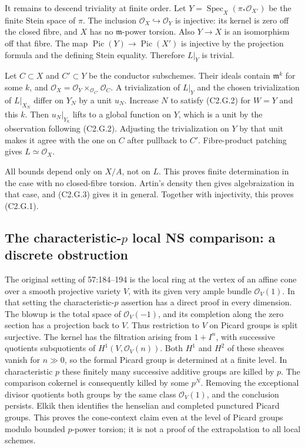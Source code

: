 It remains to descend triviality at finite order. Let
$Y=\operatorname{Spec}_X(\pi_*\mathcal O_{X'})$ be the finite Stein space
of $\pi$. The inclusion $\mathcal O_X\hookrightarrow\mathcal O_Y$ is
injective: its kernel is zero off the closed fibre, and $X$ has no
$\mathfrak m$-power torsion. Also $Y\to X$ is an isomorphism off that
fibre. The map $\operatorname{Pic}(Y)\to\operatorname{Pic}(X')$ is
injective by the projection formula and the defining Stein equality.
Therefore $L|_Y$ is trivial.

Let $C\subset X$ and $C'\subset Y$ be the conductor subschemes. Their
ideals contain $\mathfrak m^k$ for some $k$, and
$\mathcal O_X=\mathcal O_Y\times_{\mathcal O_{C'}}\mathcal O_C$.
A trivialization of $L|_Y$ and the chosen trivialization of $L|_{X_N}$
differ on $Y_N$ by a unit $u_N$. Increase $N$ to satisfy (C2.G.2) for
$W=Y$ and this $k$. Then $u_N|_{Y_k}$ lifts to a global function on $Y$,
which is a unit by the observation following (C2.G.2). Adjusting the
trivialization on $Y$ by that unit makes it agree with the one on $C$
after pullback to $C'$. Fibre-product patching gives $L\simeq\mathcal O_X$.

All bounds depend only on $X/A$, not on $L$. This proves finite
determination in the case with no closed-fibre torsion. Artin's density
then gives algebraization in that case, and (C2.G.3) gives it in general.
Together with injectivity, this proves (C2.G.1).

\subsection{The characteristic-$p$ local NS comparison: a discrete obstruction}

The original setting of 57:184--194 is the local ring at the vertex of an
affine cone over a smooth projective variety $V$, with its given very ample
bundle $\mathcal O_V(1)$. In that setting the characteristic-$p$ assertion
has a direct proof in every dimension. The blowup is the total space of
$\mathcal O_V(-1)$, and its completion along the zero section has a projection
back to $V$. Thus restriction to $V$ on Picard groups is split surjective.
The kernel has the filtration arising from $1+I^n$, with successive quotients
subquotients of $H^1(V,\mathcal O_V(n))$. Both $H^1$ and $H^2$ of these sheaves
vanish for $n\gg0$, so the formal Picard group is determined at a finite level.
In characteristic $p$ these finitely many successive additive groups are killed
by $p$. The comparison cokernel is consequently killed by some $p^N$.
Removing the exceptional divisor quotients both groups by the same class
$\mathcal O_V(1)$, and the conclusion persists. Elkik then identifies the
henselian and completed punctured Picard groups. This proves the cone-context
claim even at the level of Picard groups modulo bounded $p$-power torsion;
it is not a proof of the extrapolation to all local schemes.

